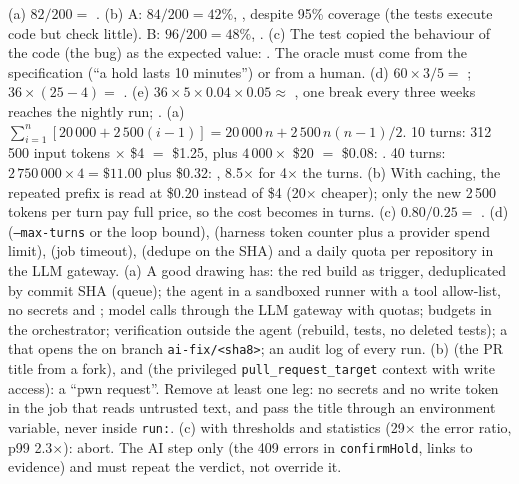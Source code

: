  (a) $82/200 =$ . (b) A: $84/200 = 42\%$, , despite 95\% coverage (the tests execute code but check little). B: $96/200 = 48\%$, . (c) The test copied the behaviour of the code (the bug) as the expected value: . The oracle must come from the specification (``a hold lasts 10 minutes'') or from a human. (d) $60 \times 3/5 =$ ; $36 \times (25 - 4) =$ . (e) $36 \times 5 \times 0.04 \times 0.05 \approx$ , one break every three weeks reaches the nightly run; .
 (a) $\sum_{i=1}^{n} [20\,000 + 2\,500(i-1)] = 20\,000\,n + 2\,500\,n(n-1)/2$. 10 turns: 312\,500 input tokens $\times$ \$4 $=$ \$1.25, plus $4\,000 \times$ \$20 $=$ \$0.08: . 40 turns: $2\,750\,000 \times 4 = \$11.00$ plus \$0.32: , 8.5$\times$ for 4$\times$ the turns. (b) With caching, the repeated prefix is read at \$0.20 instead of \$4 (20$\times$ cheaper); only the new 2\,500 tokens per turn pay full price, so the cost becomes  in turns. (c) $0.80/0.25 =$ . (d)  (\texttt{--max-turns} or the loop bound),  (harness token counter plus a provider spend limit),  (job timeout),  (dedupe on the SHA) and a daily quota per repository in the LLM gateway.
 (a) A good drawing has: the red build as trigger, deduplicated by commit SHA (queue); the agent in a sandboxed runner with a tool allow-list, no secrets and ; model calls through the LLM gateway with quotas; budgets in the orchestrator; verification outside the agent (rebuild, tests, no deleted tests); a  that opens the  on branch \texttt{ai-fix/<sha8>}; an audit log of every run. (b)  (the PR title from a fork),  and  (the privileged \texttt{pull\_request\_target} context with write access): a ``pwn request''. Remove at least one leg: no secrets and no write token in the job that reads untrusted text, and pass the title through an environment variable, never inside \texttt{run:}. (c)  with thresholds and statistics (29$\times$ the error ratio, p99 2.3$\times$): abort. The AI step only  (the 409 errors in \texttt{confirmHold}, links to evidence) and must repeat the verdict, not override it.
